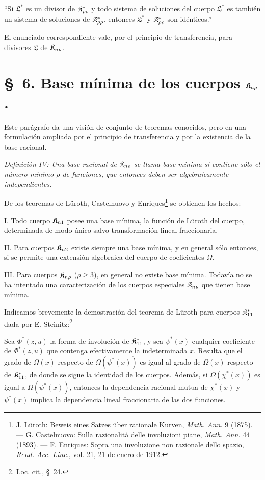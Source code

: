 \documentclass[11pt]{article}
\begin{document}
``Si $\mathfrak{L}^*$ es un divisor de $\mathfrak{K}^*_{\rho\rho}$ y todo sistema de soluciones del cuerpo $\mathfrak{L}^*$ es también un sistema de soluciones de $\mathfrak{K}^*_{\rho\rho}$, entonces $\mathfrak{L}^*$ y $\mathfrak{K}^*_{\rho\rho}$ son idénticos.''

El enunciado correspondiente vale, por el principio de transferencia, para divisores $\mathfrak{L}$ de $\mathfrak{K}_{n\rho}$.

\section*{\S\ 6. Base mínima de los cuerpos $\mathfrak{K}_{n\rho}$.}

Este parágrafo da una visión de conjunto de teoremas conocidos, pero en una formulación ampliada por el principio de transferencia y por la existencia de la base racional.

\emph{Definición IV: Una base racional de $\mathfrak{K}_{n\rho}$ se llama base mínima si contiene sólo el número mínimo $\rho$ de funciones, que entonces deben ser algebraicamente independientes.}

De los teoremas de Lüroth, Castelnuovo y Enriques\footnote{J. Lüroth: Beweis eines Satzes über rationale Kurven, \emph{Math. Ann.} 9 (1875). --- G. Castelnuovo: Sulla razionalità delle involuzioni piane, \emph{Math. Ann.} 44 (1893). --- F. Enriques: Sopra una involuzione non razionale dello spazio, \emph{Rend. Acc. Linc.}, vol. 21, 21 de enero de 1912.} se obtienen los hechos:

I. Todo cuerpo $\mathfrak{K}_{n1}$ posee una base mínima, la función de Lüroth del cuerpo, determinada de modo único salvo transformación lineal fraccionaria.

II. Para cuerpos $\mathfrak{K}_{n2}$ existe siempre una base mínima, y en general sólo entonces, si se permite una extensión algebraica del cuerpo de coeficientes $\Omega$.

III. Para cuerpos $\mathfrak{K}_{n\rho}$ ($\rho\ge3$), en general no existe base mínima. Todavía no se ha intentado una caracterización de los cuerpos especiales $\mathfrak{K}_{n\rho}$ que tienen base mínima.

Indicamos brevemente la demostración del teorema de Lüroth para cuerpos $\mathfrak{K}^*_{11}$ dada por E. Steinitz:\footnote{Loc. cit., \S\ 24.}

Sea $\Phi^*(z,u)$ la forma de involución de $\mathfrak{K}^*_{11}$, y sea $\psi^*(x)$ cualquier coeficiente de $\Phi^*(z,u)$ que contenga efectivamente la indeterminada $x$. Resulta que el grado de $\Omega(x)$ respecto de $\Omega(\psi^*(x))$ es igual al grado de $\Omega(x)$ respecto de $\mathfrak{K}^*_{11}$, de donde se sigue la identidad de los cuerpos. Además, si $\Omega(\chi^*(x))$ es igual a $\Omega(\psi^*(x))$, entonces la dependencia racional mutua de $\chi^*(x)$ y $\psi^*(x)$ implica la dependencia lineal fraccionaria de las dos funciones.
\end{document}
